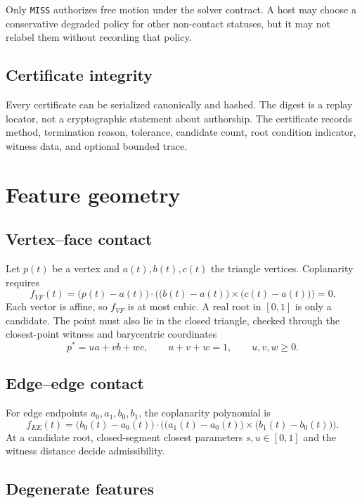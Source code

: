 \documentclass[11pt,a4paper,oneside]{book}
\newcommand{\status}[1]{\texttt{#1}}
\begin{document}
Only \status{MISS} authorizes free motion under the solver contract. A host may choose a conservative degraded policy for other non-contact statuses, but it may not relabel them without recording that policy.

\section{Certificate integrity}

Every certificate can be serialized canonically and hashed. The digest is a replay locator, not a cryptographic statement about authorship. The certificate records method, termination reason, tolerance, candidate count, root condition indicator, witness data, and optional bounded trace.

\chapter{Feature geometry}
\section{Vertex--face contact}

Let $p(t)$ be a vertex and $a(t),b(t),c(t)$ the triangle vertices. Coplanarity requires
\begin{equation}
 f_{VF}(t)=\big(p(t)-a(t)\big)\cdot\Big(\big(b(t)-a(t)\big)\times\big(c(t)-a(t)\big)\Big)=0.
 \label{eq:vf}
\end{equation}
Each vector is affine, so $f_{VF}$ is at most cubic. A real root in $[0,1]$ is only a candidate. The point must also lie in the closed triangle, checked through the closest-point witness and barycentric coordinates
\[
  p^*=u a+v b+w c,\qquad u+v+w=1,\qquad u,v,w\geq0.
\]

\section{Edge--edge contact}

For edge endpoints $a_0,a_1,b_0,b_1$, the coplanarity polynomial is
\begin{equation}
 f_{EE}(t)=\big(b_0(t)-a_0(t)\big)\cdot\Big(\big(a_1(t)-a_0(t)\big)\times\big(b_1(t)-b_0(t)\big)\Big).
 \label{eq:ee}
\end{equation}
At a candidate root, closed-segment closest parameters $s,u\in[0,1]$ and the witness distance decide admissibility.

\section{Degenerate features}
\end{document}
